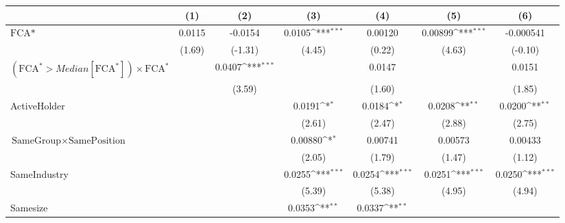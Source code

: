 {
\def\sym#1{\ifmmode^{#1}\else\(^{#1}\)\fi}
\begin{tabular}{l*{6}{c}}
\hline\hline
                    &\multicolumn{1}{c}{(1)}         &\multicolumn{1}{c}{(2)}         &\multicolumn{1}{c}{(3)}         &\multicolumn{1}{c}{(4)}         &\multicolumn{1}{c}{(5)}         &\multicolumn{1}{c}{(6)}         \\
\hline
$ \text{FCA*} $     &      0.0115         &     -0.0154         &      0.0105\sym{***}&     0.00120         &     0.00899\sym{***}&   -0.000541         \\
                    &      (1.69)         &     (-1.31)         &      (4.45)         &      (0.22)         &      (4.63)         &     (-0.10)         \\
[1em]
 $ (\text{FCA}^* > Median[\text{FCA}^*]) \times {\text{FCA} ^*}  $ &                     &      0.0407\sym{***}&                     &      0.0147         &                     &      0.0151         \\
                    &                     &      (3.59)         &                     &      (1.60)         &                     &      (1.85)         \\
[1em]
ActiveHolder        &                     &                     &      0.0191\sym{*}  &      0.0184\sym{*}  &      0.0208\sym{**} &      0.0200\sym{**} \\
                    &                     &                     &      (2.61)         &      (2.47)         &      (2.88)         &      (2.75)         \\
[1em]
 $ \text{SameGroup} \times \text{SamePosition} $&                     &                     &     0.00880\sym{*}  &     0.00741         &     0.00573         &     0.00433         \\
                    &                     &                     &      (2.05)         &      (1.79)         &      (1.47)         &      (1.12)         \\
[1em]
SameIndustry        &                     &                     &      0.0255\sym{***}&      0.0254\sym{***}&      0.0251\sym{***}&      0.0250\sym{***}\\
                    &                     &                     &      (5.39)         &      (5.38)         &      (4.95)         &      (4.94)         \\
[1em]
Samesize            &                     &                     &      0.0353\sym{**} &      0.0337\sym{**} &                     &                     \\

\end{tabular}}
